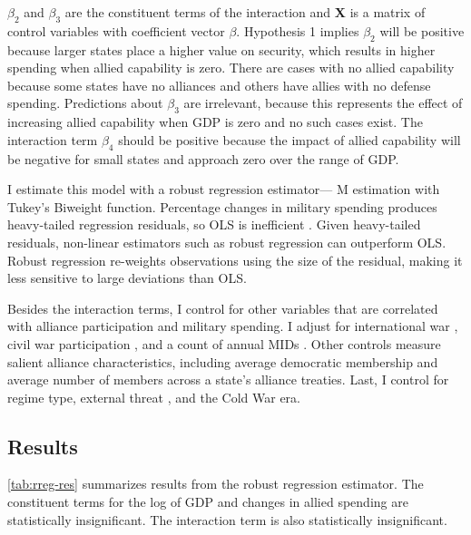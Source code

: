 \documentclass[12pt]{article}
\begin{document}
$\beta_2$ and $\beta_3$ are the constituent terms of the interaction and \textbf{X} is a matrix of control variables with coefficient vector $\beta$.
Hypothesis 1 implies $\beta_2$ will be positive because larger states place a higher value on security, which results in higher spending when allied capability is zero.
There are cases with no allied capability because some states have no alliances and others have allies with no defense spending.   
Predictions about $\beta_3$ are irrelevant, because this represents the effect of increasing allied capability when GDP is zero and no such cases exist. 
The interaction term $\beta_4$ should be positive because the impact of allied capability will be negative for small states and approach zero over the range of GDP. 


I estimate this model with a robust regression estimator--- M estimation with Tukey's Biweight function. 
Percentage changes in military spending produces heavy-tailed regression residuals, so OLS is inefficient \citep{RaineyBaissa2018}. 
Given heavy-tailed residuals, non-linear estimators such as robust regression can outperform OLS. 
Robust regression re-weights observations using the size of the residual, making it less sensitive to large deviations than OLS. 


Besides the interaction terms, I control for other variables that are correlated with alliance participation and military spending. 
I adjust for international war \citep{Reiteretal2016}, civil war participation \citep{SarkeesWayman2010}, and a count of annual MIDs \citep{Gibleretal2016}. 
Other controls measure salient alliance characteristics, including average democratic membership \citep{DigiuseppePoast2016} and average number of members across a state's alliance treaties.   
Last, I control for regime type, external threat \citep{LeedsSavun2007}, and the Cold War era. 


\subsection{Results}

 
\autoref{tab:rreg-res} summarizes results from the robust regression estimator. 
The constituent terms for the log of GDP and changes in allied spending are statistically insignificant. 
The interaction term is also statistically insignificant. 
\end{document}
